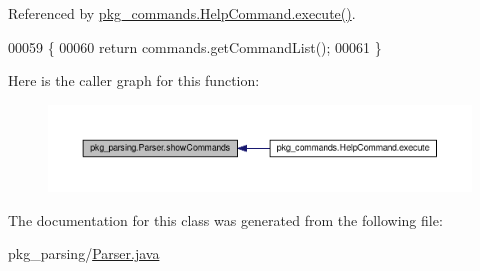 Referenced by \hyperlink{HelpCommand_8java_source_l00033}{pkg\-\_\-commands.\-Help\-Command.\-execute()}.


\begin{DoxyCode}
00059                                         \{
00060         \textcolor{keywordflow}{return} commands.getCommandList();
00061     \}
\end{DoxyCode}


Here is the caller graph for this function\-:
\nopagebreak
\begin{figure}[H]
\begin{center}
\leavevmode
\includegraphics[width=350pt]{classpkg__parsing_1_1Parser_a31545cdbdb409aaeb727289c0ea7be1b_icgraph}
\end{center}
\end{figure}




The documentation for this class was generated from the following file\-:\begin{DoxyCompactItemize}
\item 
pkg\-\_\-parsing/\hyperlink{Parser_8java}{Parser.\-java}\end{DoxyCompactItemize}
